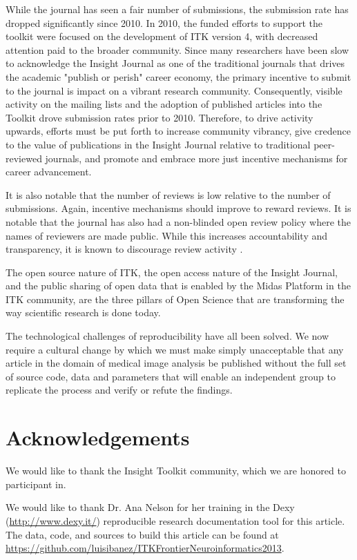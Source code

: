 \documentclass{frontiersENG} %
\begin{document}
While the journal has seen a fair number of submissions, the submission rate
has dropped significantly since 2010. In 2010, the funded efforts to support
the toolkit were focused on the development of ITK version 4, with decreased
attention paid to the broader community.  Since many researchers have been
slow to acknowledge the Insight Journal as one of the traditional journals
that drives the academic "publish or perish" career economy, the primary
incentive to submit to the journal is impact on a vibrant research community.
Consequently, visible activity on the mailing lists and the adoption of published
articles into the Toolkit drove submission rates prior to 2010. Therefore, to
drive activity upwards, efforts must be put forth to increase community
vibrancy, give credence to the value of publications in the Insight Journal
relative to traditional peer-reviewed journals, and promote and embrace more
just incentive mechanisms for career advancement.

It is also notable that the number of reviews is low relative to the number of
submissions. Again, incentive mechanisms should improve to reward reviews.  It
is notable that the journal has also had a non-blinded open review policy
where the names of reviewers are made public. While this increases
accountability and transparency, it is known to discourage review
activity \cite{Rooyen1999,Walsh2000}.


The open source nature of ITK, the open access nature of the Insight Journal,
and the public sharing of open data that is enabled by the Midas Platform in
the ITK community, are the three pillars of Open Science that are transforming
the way scientific research is done today.

The technological challenges of reproducibility have all been solved. We now
require a cultural change by which we must make simply unacceptable that any
article in the domain of medical image analysis be published without the full
set of source code, data and parameters that will enable an independent group
to replicate the process and verify or refute the findings.

\section*{Acknowledgements}

We would like to thank the Insight Toolkit community, which we are honored to
participant in.

We would like to thank Dr. Ana Nelson for her training in the Dexy
(\url{http://www.dexy.it/}) reproducible research documentation tool for this
article.  The data, code, and sources to build this article can be found at
\url{https://github.com/luisibanez/ITKFrontierNeuroinformatics2013}.
\end{document}
